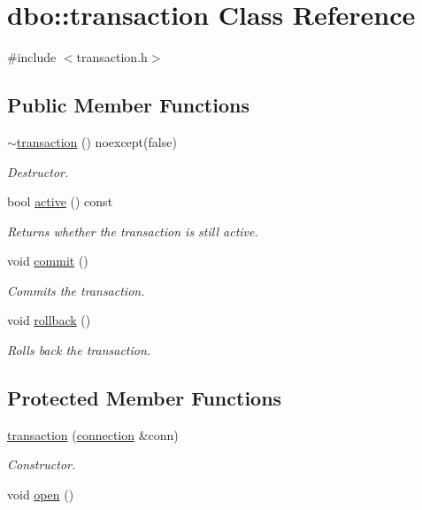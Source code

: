 \hypertarget{classdbo_1_1transaction}{\section{dbo\+:\+:transaction Class Reference}
\label{classdbo_1_1transaction}
}


{\ttfamily \#include $<$transaction.\+h$>$}

\subsection*{Public Member Functions}
\begin{DoxyCompactItemize}
\item 
\hyperlink{classdbo_1_1transaction_a9230c3550e5bbbbaf01af153caa7b8ee}{$\sim$transaction} () noexcept(false)
\begin{DoxyCompactList}\small\item\em Destructor. \end{DoxyCompactList}\item 
bool \hyperlink{classdbo_1_1transaction_ad3586b191113f790957095f1fdc1bd74}{active} () const 
\begin{DoxyCompactList}\small\item\em Returns whether the transaction is still active. \end{DoxyCompactList}\item 
void \hyperlink{classdbo_1_1transaction_a4cd2f57757397b26e69cefda212fd292}{commit} ()
\begin{DoxyCompactList}\small\item\em Commits the transaction. \end{DoxyCompactList}\item 
void \hyperlink{classdbo_1_1transaction_a0cc9d5fb8dcfd391e64c5477119afab4}{rollback} ()
\begin{DoxyCompactList}\small\item\em Rolls back the transaction. \end{DoxyCompactList}\end{DoxyCompactItemize}
\subsection*{Protected Member Functions}
\begin{DoxyCompactItemize}
\item 
\hyperlink{classdbo_1_1transaction_a91895b970904b28405ab3e2d6c7671af}{transaction} (\hyperlink{classdbo_1_1connection}{connection} \&conn)
\begin{DoxyCompactList}\small\item\em Constructor. \end{DoxyCompactList}\item 
void \hyperlink{classdbo_1_1transaction_a6f14176b1b69158df1bf0dca9cae20d2}{open} ()
\end{DoxyCompactItemize}


